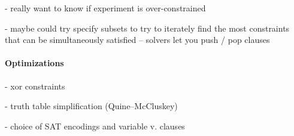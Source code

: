 - really want to know if experiment is over-constrained

- maybe could try specify subsets to try to iterately find the most constraints that can be simultaneously satisfied -- solvers let you push / pop clauses

\paragraph*{Optimizations}

- xor constraints

- truth table simplification (Quine–McCluskey)

- choice of SAT encodings and variable v. clauses

